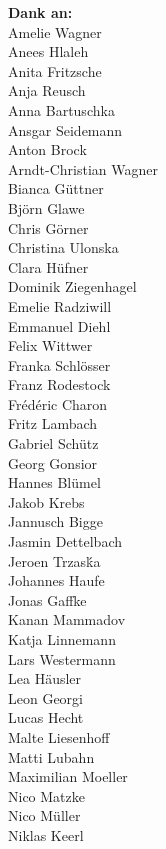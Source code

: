 \begin{minipage}[t][\textheight][b]{.25\textwidth}
\fontsize{6pt}{7.2pt}\selectfont
\raggedleft
\textbf{Dank an:}\\[1\baselineskip]
Amelie Wagner\\
Anees Hlaleh\\
Anita Fritzsche\\
Anja Reusch\\
Anna Bartuschka\\
Ansgar Seidemann\\
Anton Brock\\
Arndt-Christian Wagner\\
Bianca Güttner\\
Björn Glawe\\
Chris Görner\\
Christina Ulonska\\
Clara Hüfner\\
Dominik Ziegenhagel\\
Emelie Radziwill\\
Emmanuel Diehl\\
Felix Wittwer\\
Franka Schlösser\\
Franz Rodestock\\
Frédéric Charon\\
Fritz Lambach\\
Gabriel Schütz\\
Georg Gonsior\\
Hannes Blümel\\
Jakob Krebs\\
Jannusch Bigge\\
Jasmin Dettelbach\\
Jeroen Trzas\'ka\\
Johannes Haufe\\
Jonas Gaffke\\
Kanan Mammadov\\
Katja Linnemann\\
Lars Westermann\\
Lea Häusler\\
Leon Georgi\\
Lucas Hecht\\
Malte Liesenhoff\\
Matti Lubahn\\
Maximilian Moeller\\
Nico Matzke\\
Nico Müller\\
Niklas Keerl\\

\end{minipage}
